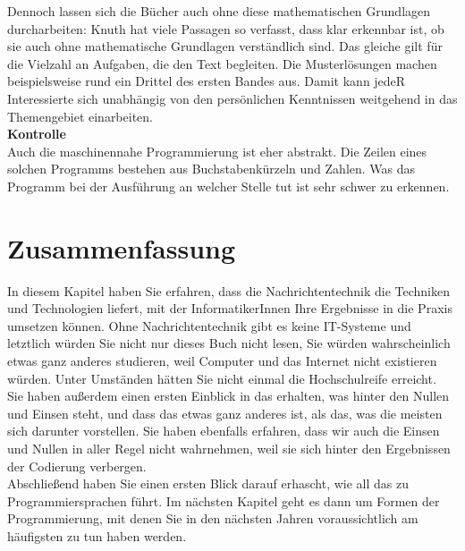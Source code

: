 Dennoch lassen sich die Bücher auch ohne diese mathematischen Grundlagen durcharbeiten: Knuth hat viele Passagen so verfasst, dass klar erkennbar ist, ob sie auch ohne mathematische Grundlagen verständlich sind. Das gleiche gilt für die Vielzahl an Aufgaben, die den Text begleiten. Die Musterlösungen machen beispielsweise rund ein Drittel des ersten Bandes aus. Damit kann jedeR Interessierte sich unabhängig von den persönlichen Kenntnissen weitgehend in das Themengebiet einarbeiten.\\

\textbf{Kontrolle}\\
Auch die maschinennahe Programmierung ist eher abstrakt. Die Zeilen eines solchen Programms bestehen aus Buchstabenkürzeln und Zahlen. Was das Programm bei der Ausführung an welcher Stelle tut ist sehr schwer zu erkennen.

\section{Zusammenfassung}
In diesem Kapitel haben Sie erfahren, dass die Nachrichtentechnik die Techniken und Technologien liefert, mit der InformatikerInnen Ihre Ergebnisse in die Praxis umsetzen können. Ohne Nachrichtentechnik gibt es keine IT-Systeme und letztlich würden Sie nicht nur dieses Buch nicht lesen, Sie würden wahrscheinlich etwas ganz anderes studieren, weil Computer und das Internet nicht existieren würden. Unter Umständen hätten Sie nicht einmal die Hochschulreife erreicht.\\

Sie haben außerdem einen ersten Einblick in das erhalten, was hinter den Nullen und Einsen steht, und dass das etwas ganz anderes ist, als das, was die meisten sich darunter vorstellen. Sie haben ebenfalls erfahren, dass wir auch die Einsen und Nullen in aller Regel nicht wahrnehmen, weil sie sich hinter den Ergebnissen der Codierung verbergen.\\

Abschließend haben Sie einen ersten Blick darauf erhascht, wie all das zu Programmiersprachen führt. Im nächsten Kapitel geht es dann um Formen der Programmierung, mit denen Sie in den nächsten Jahren voraussichtlich am häufigsten zu tun haben werden.